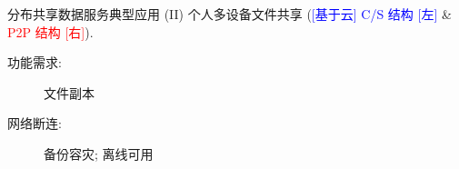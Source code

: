 \begin{frame}{分布共享数据服务典型应用 (II)}
  {个人多设备文件共享 {(\textcolor{blue}{\scriptsize [基于云] C/S 结构 [左]} \& 
  \textcolor{red}{\scriptsize P2P 结构 [右]}).}}

  \begin{description}
    \item[功能需求:] 文件副本 
    \item[网络断连:] 备份容灾; 离线可用
  \end{description}
\end{frame}
% 
